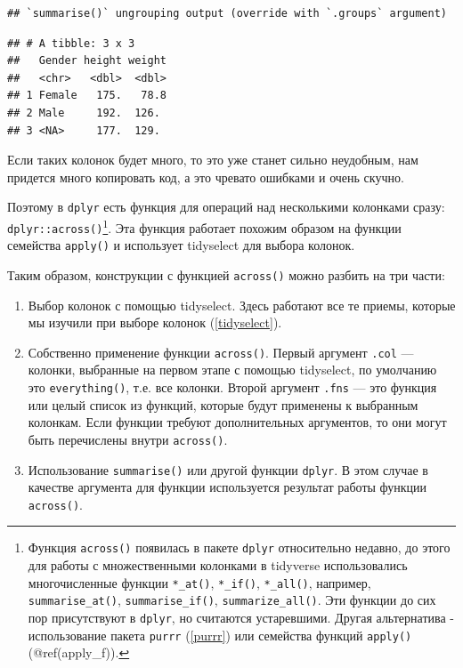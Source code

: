 \documentclass[
]{book}
\providecommand{\tightlist}{%
  \setlength{\itemsep}{0pt}\setlength{\parskip}{0pt}}
\begin{document}
\begin{verbatim}
## `summarise()` ungrouping output (override with `.groups` argument)
\end{verbatim}

\begin{verbatim}
## # A tibble: 3 x 3
##   Gender height weight
##   <chr>   <dbl>  <dbl>
## 1 Female   175.   78.8
## 2 Male     192.  126. 
## 3 <NA>     177.  129.
\end{verbatim}

Если таких колонок будет много, то это уже станет сильно неудобным, нам придется много копировать код, а это чревато ошибками и очень скучно.

Поэтому в \texttt{dplyr} есть функция для операций над несколькими колонками сразу: \texttt{dplyr::across()}\footnote{Функция \texttt{across()} появилась в пакете \texttt{dplyr} относительно недавно, до этого для работы с множественными колонками в tidyverse использовались многочисленные функции \texttt{*\_at()}, \texttt{*\_if()}, \texttt{*\_all()}, например, \texttt{summarise\_at()}, \texttt{summarise\_if()}, \texttt{summarize\_all()}. Эти функции до сих пор присутствуют в \texttt{dplyr}, но считаются устаревшими. Другая альтернатива - использование пакета \texttt{purrr} (\ref{purrr}) или семейства функций \texttt{apply()} (@ref(apply\_f)).}. Эта функция работает похожим образом на функции семейства \texttt{apply()} и использует tidyselect для выбора колонок.

Таким образом, конструкции с функцией \texttt{across()} можно разбить на три части:

\begin{enumerate}
\def\labelenumi{\arabic{enumi}.}
\tightlist
\item
  Выбор колонок с помощью tidyselect. Здесь работают все те приемы, которые мы изучили при выборе колонок (\ref{tidyselect}).
\item
  Собственно применение функции \texttt{across()}. Первый аргумент \texttt{.col} --- колонки, выбранные на первом этапе с помощью tidyselect, по умолчанию это \texttt{everything()}, т.е. все колонки. Второй аргумент \texttt{.fns} --- это функция или целый список из функций, которые будут применены к выбранным колонкам. Если функции требуют дополнительных аргументов, то они могут быть перечислены внутри \texttt{across()}.
\item
  Использование \texttt{summarise()} или другой функции \texttt{dplyr}. В этом случае в качестве аргумента для функции используется результат работы функции \texttt{across()}.
\end{enumerate}
\end{document}
